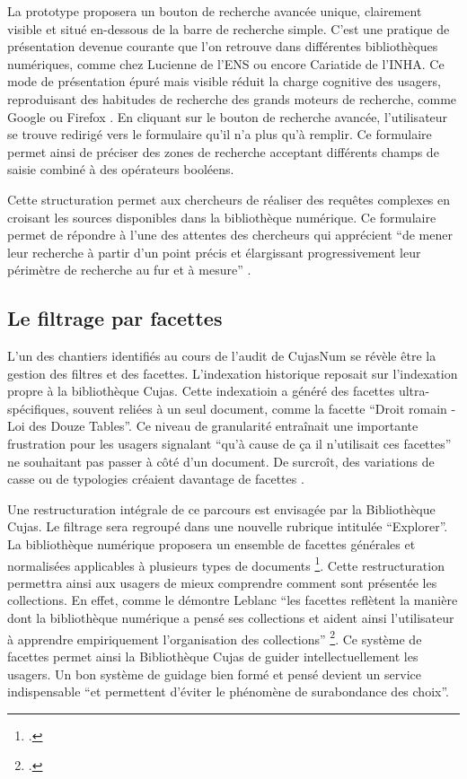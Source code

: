 La prototype proposera un bouton de recherche avancée unique, clairement visible et situé en-dessous de la barre de recherche simple. C'est une pratique de présentation devenue courante que l'on retrouve dans différentes bibliothèques numériques, comme chez Lucienne de l'\ac{ENS} ou encore Cariatide de l'\ac{INHA}. Ce mode de présentation épuré mais visible réduit la charge cognitive des usagers, reproduisant des habitudes de recherche des grands moteurs de recherche, comme Google ou Firefox . En cliquant sur le bouton de recherche avancée, l'utilisateur se trouve redirigé vers le formulaire qu'il n'a plus qu'à remplir. Ce formulaire permet ainsi de préciser des zones de recherche acceptant différents champs de saisie combiné à des opérateurs booléens.

Cette structuration permet aux chercheurs de réaliser des requêtes complexes en croisant les sources disponibles dans la bibliothèque numérique. Ce formulaire permet de répondre à l'une des attentes des chercheurs qui apprécient \enquote{de mener leur recherche à partir d'un point précis et élargissant progressivement leur périmètre de recherche au fur et à mesure} .

\subsection{Le filtrage par facettes}
L'un des chantiers identifiés au cours de l'audit de CujasNum se révèle être la gestion des filtres et des facettes. L'indexation historique reposait sur l'indexation propre à la bibliothèque Cujas. Cette indexatioin a généré des facettes ultra-spécifiques, souvent reliées à un seul document, comme la facette \enquote{Droit romain - Loi des Douze Tables}. Ce niveau de granularité entraînait une importante frustration pour les usagers signalant \enquote{qu'à cause de ça il n'utilisait ces facettes} ne souhaitant pas passer à côté d'un document. De surcroît, des variations de casse ou de typologies créaient davantage de facettes .

Une restructuration intégrale de ce parcours est envisagée par la Bibliothèque Cujas. Le filtrage sera regroupé dans une nouvelle rubrique intitulée \enquote{Explorer}. La bibliothèque numérique proposera un ensemble de facettes générales et normalisées applicables à plusieurs types de documents \footnote{.}. Cette restructuration permettra ainsi aux usagers de mieux comprendre comment sont présentée les collections. En effet, comme le démontre Leblanc \enquote{les facettes reflètent la manière dont la bibliothèque numérique a pensé ses collections et aident ainsi l'utilisateur à apprendre empiriquement l'organisation des collections} \footcite{leblancBibliothequesNumeriquesEnrichies}. Ce système de facettes permet ainsi la Bibliothèque Cujas de guider intellectuellement les usagers. Un bon système de guidage bien formé et pensé devient un service indispensable \enquote{et permettent d'éviter le phénomène de surabondance des choix}.


